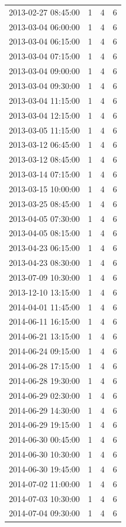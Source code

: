 \begin{tabular}{lrrr}
2013-02-27 08:45:00 & 1 & 4 & 6 \\
2013-03-04 06:00:00 & 1 & 4 & 6 \\
2013-03-04 06:15:00 & 1 & 4 & 6 \\
2013-03-04 07:15:00 & 1 & 4 & 6 \\
2013-03-04 09:00:00 & 1 & 4 & 6 \\
2013-03-04 09:30:00 & 1 & 4 & 6 \\
2013-03-04 11:15:00 & 1 & 4 & 6 \\
2013-03-04 12:15:00 & 1 & 4 & 6 \\
2013-03-05 11:15:00 & 1 & 4 & 6 \\
2013-03-12 06:45:00 & 1 & 4 & 6 \\
2013-03-12 08:45:00 & 1 & 4 & 6 \\
2013-03-14 07:15:00 & 1 & 4 & 6 \\
2013-03-15 10:00:00 & 1 & 4 & 6 \\
2013-03-25 08:45:00 & 1 & 4 & 6 \\
2013-04-05 07:30:00 & 1 & 4 & 6 \\
2013-04-05 08:15:00 & 1 & 4 & 6 \\
2013-04-23 06:15:00 & 1 & 4 & 6 \\
2013-04-23 08:30:00 & 1 & 4 & 6 \\
2013-07-09 10:30:00 & 1 & 4 & 6 \\
2013-12-10 13:15:00 & 1 & 4 & 6 \\
2014-04-01 11:45:00 & 1 & 4 & 6 \\
2014-06-11 16:15:00 & 1 & 4 & 6 \\
2014-06-21 13:15:00 & 1 & 4 & 6 \\
2014-06-24 09:15:00 & 1 & 4 & 6 \\
2014-06-28 17:15:00 & 1 & 4 & 6 \\
2014-06-28 19:30:00 & 1 & 4 & 6 \\
2014-06-29 02:30:00 & 1 & 4 & 6 \\
2014-06-29 14:30:00 & 1 & 4 & 6 \\
2014-06-29 19:15:00 & 1 & 4 & 6 \\
2014-06-30 00:45:00 & 1 & 4 & 6 \\
2014-06-30 10:30:00 & 1 & 4 & 6 \\
2014-06-30 19:45:00 & 1 & 4 & 6 \\
2014-07-02 11:00:00 & 1 & 4 & 6 \\
2014-07-03 10:30:00 & 1 & 4 & 6 \\
2014-07-04 09:30:00 & 1 & 4 & 6 \\

\end{tabular}

